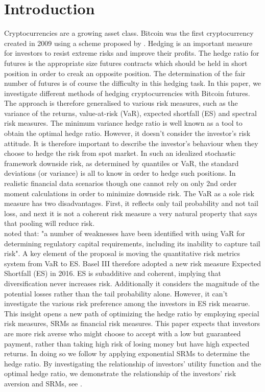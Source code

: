 \documentclass[11pt,a4paper,english]{article}
\begin{document}
\section{Introduction}

Cryptocurrencies are a growing asset class.
Bitcoin was the first cryptocurrency created in 2009 using a scheme proposed by \citet{nakamoto2019bitcoin}.
Hedging is an important measure for investors to resist extreme risks and improve their profits.
The hedge ratio for futures is the appropriate size futures contracts which should be held in short position
in order to creak an opposite position.
The determination of the fair number of futures is of course the difficulty in this hedging task.
In this paper, we investigate different methods of hedging cryptocurrencies with Bitcoin futures.
The approach is therefore generalised to various risk measures, such as the variance of the returns,
value-at-risk (VaR), expected shortfall (ES) and spectral risk measures.
The minimum variance hedge ratio is well known as a tool to obtain the optimal hedge ratio.
However, it doesn't consider the investor's risk attitude.
It is therefore important to describe the investor's behaviour when they choose to hedge the risk from spot market.
In such an idealized stochastic framework downside risk, as determined by quantiles or VaR,
the standard deviations (or variance) is all to know in order to hedge such positions.
In realistic financial data scenarios though one cannot rely on only 2nd order moment calculations in order to minimize downside risk.
The VaR as a sole risk measure has two disadvantages.
First, it reflects only tail probability and not tail loss, and next it is not a coherent risk measure a very natural property that says that pooling will reduce risk. \\

{\color{red}\citet{basel2013consultative} noted that: "a number of weaknesses have been identified with using VaR for determining regulatory capital requirements, including its inability to capture tail risk". A key element of the proposal is moving the quantitative risk metrics system from VaR to ES. Basel III therefore adopted a new risk measure Expected Shortfall (ES) in 2016. ES is subadditive and coherent, implying that diversification never increases risk. Additionally it considers the magnitude of the potential losses rather than the tail probability alone. However, it can't investigate the various risk preference among the investors in ES risk measrue.} This insight opens a new path of optimizing the hedge ratio by employing special risk measures, SRMs as financial risk measures.
This paper expects that investors are more risk averse who might choose to accept with a low but guaranteed payment,
rather than taking high risk of losing money but have high expected returns.
In doing so we follow \citet{barbi2014copula} by applying exponential SRMs to determine the hedge ratio.
By investigating the relationship of investors' utility function and the optimal hedge ratio, we demonstrate the relationship of the investors' risk aversion and SRMs, see \citet{brandtner2015decision}.\\
\end{document}
